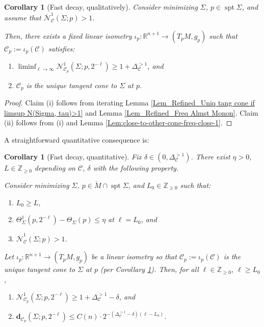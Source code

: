 \documentclass[11pt, letterpaper, reqno]{amsart}
\numberwithin{equation}{section}
\newtheorem{Cor}[Def]{Corollary}
\theoremstyle{remark}
\newcommand{\RR}{\mathbb{R}}
\newcommand{\ZZ}{\mathbb{Z}}
\newcommand{\cC}{\mathcal{C}}
\newcommand{\cN}{\mathcal{N}}
\newcommand{\mbfd}{\mathbf{d}}
\newcommand{\spt}{\operatorname{spt}}
\begin{document}
\begin{Cor}[Fast decay, qualitatively]\label{Cor:unif-high-freq-qualitative}
Consider minimizing $\Sigma$, $p \in \spt \Sigma$, and assume that $\overline{\cN}^{1}_{\cC}(\Sigma; p) > 1$. 

Then, there exists a fixed linear isometry $\iota_p : \RR^{n+1} \to (T_p M, g_p)$ such that $\cC_p := \iota_p(\cC)$ satisfies:
\begin{enumerate}
	\item[(i)] $\liminf_{\ell \to \infty} \cN^{1}_{\cC_p}(\Sigma; p, 2^{-\ell}) \geq 1 + \Delta_\cC^{>1}$, and
	\item[(ii)] $\cC_p$ is the unique tangent cone to $\Sigma$ at $p$.
\end{enumerate}
\end{Cor}
\begin{proof}
	Claim (i) follows from iterating Lemma \ref{Lem_Refined_Uniq tang cone if limsup N(Sigma, tau)>1} and Lemma \ref{Lem_Refined_Freq Almst Monon}. Claim (ii) follows from (i) and Lemma \ref{Lem:close-to-other-cone-freq-close-1}.
\end{proof}



A straightforward quantitative consequence is:

\begin{Cor}[Fast decay, quantitative] \label{Cor:unif-high-freq-quantitative}
Fix $\delta \in (0, \Delta_{\cC}^{>1})$. There exist $\eta>0$, $L \in \ZZ_{\geq 0}$ depending on $\cC$, $\delta$ with the following property. 

Consider minimizing $\Sigma$, $p \in \breve M \cap \spt \Sigma$, and $L_0 \in \ZZ_{\geq 0}$ such that:
\begin{enumerate}
	\item $L_0 \geq L$,
	\item $\Theta^{1}_\Sigma(p,2^{-\ell}) - \Theta_\Sigma(p)\leq \eta$ at $\ell = L_0$, and
	\item $\overline{\cN}^{1}_{\cC}(\Sigma; p) > 1$.
\end{enumerate}
Let $\iota_p : \RR^{n+1} \to (T_p M, g_p)$ be a linear isometry so that $\cC_p := \iota_p(\cC)$ is the unique tangent cone to $\Sigma$ at $p$ (per Corollary \ref{Cor:unif-high-freq-qualitative}). Then, for all $\ell \in \ZZ_{\geq 0}$, $\ell \geq L_0$,
\begin{enumerate}
	\item[(i)] $\cN^{1}_{\cC_p}(\Sigma;p,2^{-\ell}) \geq 1+ \Delta_\cC^{>1} - \delta$, and
	\item[(ii)] $\mbfd_{\cC_p}(\Sigma;p,2^{-\ell}) \leq C(n) \cdot 2^{-(\Delta_\cC^{>1}- \delta)(\ell-L_0)}$.
\end{enumerate}
\end{Cor}

\end{document}
